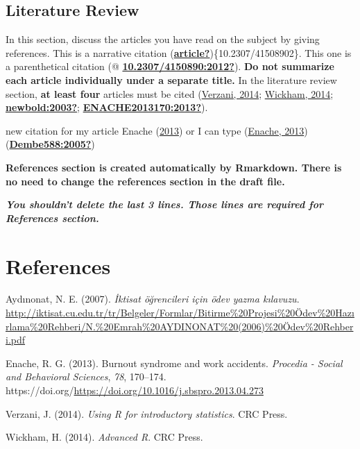 \documentclass[
  12pt,
]{article}
\newlength{\cslhangindent}
\newlength{\cslentryspacingunit} %
\newenvironment{CSLReferences}[2] %
 {%
  \setlength{\parindent}{0pt}
  \ifodd #1
  \let\oldpar\par
  \def\par{\hangindent=\cslhangindent\oldpar}
  \fi
  \setlength{\parskip}{#2\cslentryspacingunit}
 }%
 {}
\begin{document}
\hypertarget{literature-review}{%
\subsection{Literature Review}\label{literature-review}}

In this section, discuss the articles you have read on the subject by giving references. This is a narrative citation (\protect\hyperlink{ref-article}{\textbf{article?}})\{10.2307/41508902\}. This one is a parenthetical citation (@ \protect\hyperlink{ref-10.2307ux2f4150890:2012}{\textbf{10.2307/4150890:2012?}}). \textbf{Do not summarize each article individually under a separate title.} In the literature review section, \textbf{at least four} articles must be cited (\protect\hyperlink{ref-verzani:2014}{Verzani, 2014}; \protect\hyperlink{ref-wickham:2014}{Wickham, 2014}; \protect\hyperlink{ref-newbold:2003}{\textbf{newbold:2003?}}; \protect\hyperlink{ref-ENACHE2013170:2013}{\textbf{ENACHE2013170:2013?}}).

new citation for my article Enache (\protect\hyperlink{ref-ENACHE2013170}{2013}) or I can type (\protect\hyperlink{ref-ENACHE2013170}{Enache, 2013})
(\protect\hyperlink{ref-Dembe588:2005}{\textbf{Dembe588:2005?}})

\textbf{References section is created automatically by Rmarkdown. There is no need to change the references section in the draft file.}

\textbf{\emph{You shouldn't delete the last 3 lines. Those lines are required for References section.}}

\newpage

\hypertarget{references}{%
\section{References}\label{references}}

\hypertarget{refs}{}
\begin{CSLReferences}{1}{0}
\leavevmode{}%
Aydınonat, N. E. (2007). \emph{İktisat öğrencileri için ödev yazma kılavuzu}. \url{http://iktisat.cu.edu.tr/tr/Belgeler/Formlar/Bitirme\%20Projesi\%20Ödev\%20Hazırlama\%20Rehberi/N.\%20Emrah\%20AYDINONAT\%20(2006)\%20Ödev\%20Rehberi.pdf}

\leavevmode{}%
Enache, R. G. (2013). Burnout syndrome and work accidents. \emph{Procedia - Social and Behavioral Sciences}, \emph{78}, 170--174. https://doi.org/\url{https://doi.org/10.1016/j.sbspro.2013.04.273}

\leavevmode{}%
Verzani, J. (2014). \emph{Using {R} for introductory statistics}. CRC Press.

\leavevmode{}%
Wickham, H. (2014). \emph{Advanced {R}}. CRC Press.

\end{CSLReferences}
\end{document}
